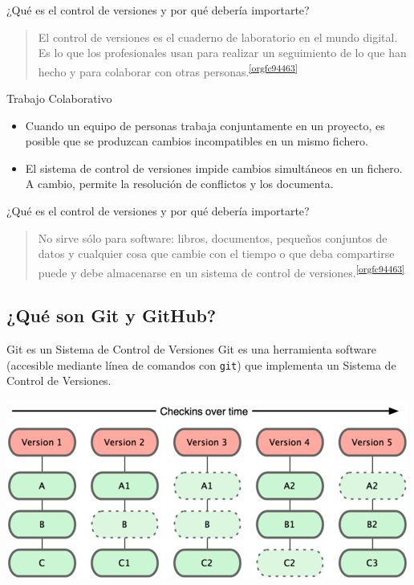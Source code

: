 \documentclass[aspectratio=169, xcolor={usenames,svgnames,dvipsnames}]{beamer}
\begin{document}
\begin{frame}[label={sec:org55cbc94}]{¿Qué es el control de versiones y por qué debería importarte?}
\begin{quote}
El control de versiones es el \alert{cuaderno de laboratorio} en el mundo digital. Es lo que los profesionales usan para realizar un
\alert{seguimiento} de lo que han hecho y para \alert{colaborar} con otras
personas.\textsuperscript{\ref{orgfc94463}}
\end{quote}

\begin{block}{Trabajo Colaborativo}
\begin{itemize}
\item Cuando un equipo de personas trabaja conjuntamente en un proyecto, es posible que se produzcan cambios incompatibles en un mismo fichero.
\item El sistema de control de versiones \alert{impide} cambios simultáneos en un fichero. A cambio, permite la \alert{resolución de conflictos} y los documenta.
\end{itemize}
\end{block}
\end{frame}

\begin{frame}[label={sec:orgf9c4700}]{¿Qué es el control de versiones y por qué debería importarte?}
\begin{quote}
\alert{No sirve sólo para software}: libros, documentos, pequeños conjuntos
de datos y cualquier cosa que cambie con el tiempo o que deba
compartirse puede y debe almacenarse en un sistema de control de
versiones.\textsuperscript{\ref{orgfc94463}}
\end{quote}
\end{frame}

\subsection{¿Qué son Git y GitHub?}
\label{sec:org544c50f}

\begin{frame}[label={sec:org1e1384e},fragile]{Git es un Sistema de Control de Versiones}
 Git es una herramienta software (accesible mediante línea de comandos con \texttt{git}) que implementa un Sistema de Control de Versiones.

\begin{center}
\includegraphics[width=.9\linewidth]{figs/git_model.png}
\end{center}
\end{frame}
\end{document}
